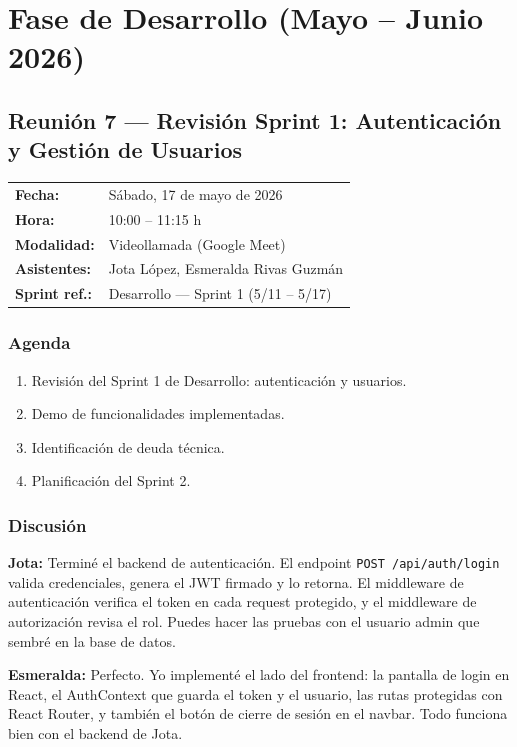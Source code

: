 \documentclass[12pt, a4paper]{article}
\makeatletter
\newcommand{\actaheader}[5]{%
  \begin{mdframed}[
    backgroundcolor=sectionbg,
    linecolor=bordercolor,
    linewidth=1pt,
    innerleftmargin=12pt, innerrightmargin=12pt,
    innertopmargin=10pt, innerbottommargin=10pt,
    skipabove=8pt, skipbelow=8pt
  ]
  \begin{tabularx}{\linewidth}{@{}lX@{}}
    \textbf{Fecha:}       & #1 \\[2pt]
    \textbf{Hora:}        & #2 \\[2pt]
    \textbf{Modalidad:}   & #3 \\[2pt]
    \textbf{Asistentes:}  & #4 \\[2pt]
    \textbf{Sprint ref.:} & #5 \\
  \end{tabularx}
  \end{mdframed}%
}
\newcommand{\jota}[1]{\noindent\textbf{\color{primary}Jota:} #1\par\smallskip}
\newcommand{\esme}[1]{\noindent\textbf{\color{accentgreen}Esmeralda:} #1\par\smallskip}
\makeatother
\begin{document}
\section{Fase de Desarrollo (Mayo -- Junio 2026)}

\subsection{Reunión 7 — Revisión Sprint 1: Autenticación y Gestión de Usuarios}
\actaheader
  {Sábado, 17 de mayo de 2026}
  {10:00 -- 11:15 h}
  {Videollamada (Google Meet)}
  {Jota López, Esmeralda Rivas Guzmán}
  {Desarrollo — Sprint 1 (5/11 -- 5/17)}

\subsubsection*{Agenda}
\begin{enumerate}[leftmargin=1.5em]
  \item Revisión del Sprint 1 de Desarrollo: autenticación y usuarios.
  \item Demo de funcionalidades implementadas.
  \item Identificación de deuda técnica.
  \item Planificación del Sprint 2.
\end{enumerate}

\subsubsection*{Discusión}

\jota{Terminé el backend de autenticación. El endpoint \texttt{POST /api/auth/login} valida credenciales, genera el JWT firmado y lo retorna. El middleware de autenticación verifica el token en cada request protegido, y el middleware de autorización revisa el rol. Puedes hacer las pruebas con el usuario admin que sembré en la base de datos.}

\esme{Perfecto. Yo implementé el lado del frontend: la pantalla de login en React, el AuthContext que guarda el token y el usuario, las rutas protegidas con React Router, y también el botón de cierre de sesión en el navbar. Todo funciona bien con el backend de Jota.}
\end{document}
